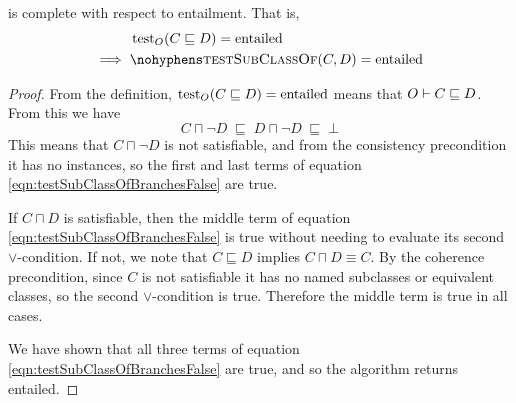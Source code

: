 \documentclass[paper.tex]{subfiles}
\begin{document}
\begin{lemma}
   is complete with respect to entailment.  That is,
  \begin{align*}
    & \test_O(C \sqsubseteq D) = \mathrm{entailed} \\
    \implies{}& \textproc{testSubClassOf}(C, D) = \mathrm{entailed}
  \end{align*}
\end{lemma}
\begin{proof}
  From the definition, $\operatorname{test}_O(C \sqsubseteq D) = \mathrm{entailed}$ means that $O \vdash C \sqsubseteq D$.  From this we have
  \[ C \sqcap \neg D \;\sqsubseteq\; D \sqcap \neg D \;\sqsubseteq\; \bot \]
  This means that $C \sqcap \neg D$ is not satisfiable, and from the consistency precondition it has no instances, so the first and last terms of equation \ref{eqn:testSubClassOfBranchesFalse} are true.

  If $C \sqcap D$ is satisfiable, then the middle term of equation \ref{eqn:testSubClassOfBranchesFalse} is true without needing to evaluate its second $\lor$-condition.  If not, we note that $C \sqsubseteq D$ implies $C \sqcap D \equiv C$.  By the coherence precondition, since $C$ is not satisfiable it has no named subclasses or equivalent classes, so the second $\lor$-condition is true.  Therefore the middle term is true in all cases.

  We have shown that all three terms of equation \ref{eqn:testSubClassOfBranchesFalse} are true, and so the algorithm returns entailed.
\end{proof}

%
%
%
\end{document}
